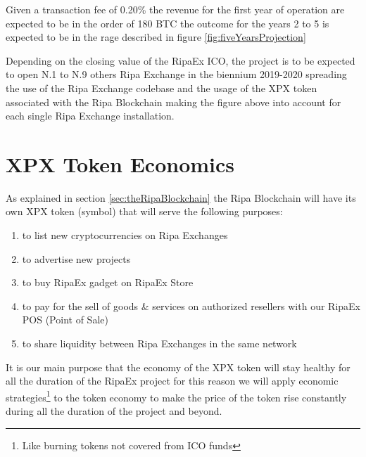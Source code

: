 \documentclass[11pt,fleqn]{book} %
\begin{document}
Given a transaction fee of 0.20\% the revenue for the first year of operation are expected to be in the order of 180 BTC the 
outcome for the years 2 to 5 is expected to be in the rage described in figure \ref{fig:fiveYearsProjection} 
\begin{center}
	\label{fig:fiveYearsProjection}
\end{center}

Depending on the closing value of the RipaEx ICO, the project is to be expected to open N.1 to N.9 others Ripa Exchange in 
the biennium 2019-2020 spreading the use of the Ripa Exchange codebase and the usage of the XPX token associated with the 
Ripa Blockchain making the figure above into account for each single Ripa Exchange installation.

\section{XPX Token Economics}
As explained in section \ref{sec:theRipaBlockchain} the Ripa Blockchain will have its own XPX token (\PHP symbol) that 
will serve the following purposes:
	\begin{enumerate}
		\item to list new cryptocurrencies on Ripa Exchanges
		\item to advertise new projects
		\item to buy RipaEx gadget on RipaEx Store
		\item to pay for the sell of goods \& services on authorized resellers with our RipaEx POS (Point of Sale)
		\item to share liquidity between Ripa Exchanges in the same network
	\end{enumerate}
It is our main purpose that the economy of the XPX token will stay healthy for all the duration of the RipaEx project for 
this reason we will apply economic strategies\footnote{Like burning tokens not covered from ICO funds} 
to the token economy to make the price of the token rise constantly during all the duration of the project and beyond.
\end{document}
